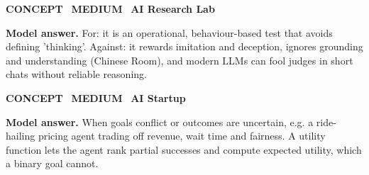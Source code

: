 \documentclass[11pt]{article}
\begin{document}
\begin{tcolorbox}[enhanced,breakable,colback=white,colframe=teal,arc=2mm,boxrule=0.8pt,left=3mm,right=3mm,
 title={\textbf{QI.04}\quad Is passing the Turing Test evidence of intelligence? Argue both sides briefly.},fonttitle=\color{white}\small,colbacktitle=teal]
\colorbox{teal!15}{\scriptsize\bfseries\color{teal} CONCEPT}\
\colorbox{gold!85!black!15}{\scriptsize\bfseries\color{gold!85!black} MEDIUM}\
\colorbox{navy!8}{\scriptsize\bfseries\color{navy} AI Research Lab}\par\smallskip
\textbf{\color{navy}Model answer.} For: it is an operational, behaviour-based test that avoids defining 'thinking'. Against: it rewards imitation and deception, ignores grounding and understanding (Chinese Room), and modern LLMs can fool judges in short chats without reliable reasoning.
\end{tcolorbox}
\begin{tcolorbox}[enhanced,breakable,colback=white,colframe=teal,arc=2mm,boxrule=0.8pt,left=3mm,right=3mm,
 title={\textbf{QI.05}\quad When would you choose a utility-based agent over a goal-based agent?},fonttitle=\color{white}\small,colbacktitle=teal]
\colorbox{teal!15}{\scriptsize\bfseries\color{teal} CONCEPT}\
\colorbox{gold!85!black!15}{\scriptsize\bfseries\color{gold!85!black} MEDIUM}\
\colorbox{navy!8}{\scriptsize\bfseries\color{navy} AI Startup}\par\smallskip
\textbf{\color{navy}Model answer.} When goals conflict or outcomes are uncertain, e.g. a ride-hailing pricing agent trading off revenue, wait time and fairness. A utility function lets the agent rank partial successes and compute expected utility, which a binary goal cannot.
\end{tcolorbox}
\end{document}
